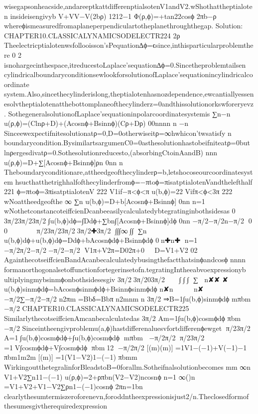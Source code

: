 {{{{{{{{{{{wisegapsonheacside,andareeptkattdifferenptialsotenV1andV2.wShothattheptialoten
insideisengivyb
V+VV−V(2bρ)
1212−1
Φ(ρ,ϕ)=+tan22cosϕ
2πb−ρ
whereϕismeasuredfromaplaneperpendiculartotheplanethroughthegap.
Solution:
CHAPTER10.CLASSICALYNAMICSODELECTR224
2ρ
Theelectricptialotenwsfollooisson’sPequation∆ϕ=ϵsince,inthisparticularproblemthere
0
2
isnohargecinthespace,itreducestoLaplace’sequation∆ϕ=0.Sincetheproblemtailsen
cylindricalboundaryconditionsewlookforsolutionofLaplace’sequationincylindricalcoordinate
system.Also,sincethecylinderislong,theptialotenhasnozdependence,ewcantiallyessen
esolvtheptialotenatthebottomplaneofthecylinderz=0andthissolutionorkswforeryevz.
SothegeneralsolutionofLaplace’sequationinpolarcoordinatesystemis
∑n−n
u(ρ,ϕ)=(Clnρ+D)+(Acosnϕ+Bsinnϕ)(Cρ+Dρ)
00nnnn
n
−n
Sinceewexpectifnitesolutionatρ=0,D=0otherwiseitρ=∞hwhicon’twsatisfy
n
boundarycondition.BysimilartsargumenC0=0asthesolutionhastobeifniteatρ=0but
lnρergesdivatρ=0.Sothesolutionreducesto,(absorbingCtoinAandB)
nnn
u(ρ,ϕ)=D+∑[Acosnϕ+Bsinnϕ]ρn
0nn
n
Theboundaryconditionare,attheedgeofthecylinderρ=b,letshocoseourcoordinatesystem
hsucthatthetrighhalfofthecylinderfromϕ=−πtoϕ=πisatptialotenVandthelefthalf
221
ϕ=πtoϕ=3πisatptialotenV
222
{V1if−π<ϕ<π
u(b,ϕ)=22
Vifπ<ϕ<3π
222
wNoattheedgeofthe
∞
∑n
u(b,ϕ)=D+b[Acosnϕ+Bsinnϕ]
0nn
n=1
wNothetconstancoteiffcienDcanbeeasilycalculatedybtegratinginbothsidesas
0
3π/23π/23π/2
∫u(b,ϕ)dϕ=∫Ddϕ+∑bn∫[Acosnϕ+Bsinnϕ]dϕ
0nn
−π/2−π/2n−π/2
0
0

✚❃
✚❃
✚
π/23π/23π/23π/2✚3π/2
∫∫∫∞∫∫
∑n✚✚
✚✚
u(b,ϕ)dϕ+u(b,ϕ)dϕ=Ddϕ+bAcosnϕdϕ+Bsinnϕdϕ
0n✚n✚
n=1✚
✚
−π/2π/2−π/2−π/2−π/2
V1π+V2π=D02π+0✚✚
D=V1+V2
02
AgainthecotseiffcienBandAcanbecalculatedybusingthefactthat{sinϕ}and{cosϕ}
nnnn
formanorthogonalsetoffunctionfortegerinsetofn.tegratingIntheeabvoexpressionyb
ultiplyingmybsinmϕonbothsidesesgiv
3π/23π/203π/2
✘✿
∫∫✘∫
∑✘✘
n✘✘
✘
u(b,ϕ)sinmϕdϕ=bAcosnϕsinmϕdϕ+Bsinnϕsinmϕdϕ
n✘n
✘✘
✘
n✘
−π/2∑−π/2−π/2
n2πm
=Bbδ=Bbπ
n2mnm
n
3π/2
⇒B=1∫u(b,ϕ)sinmϕdϕ
mπbm
−π/2
CHAPTER10.CLASSICALYNAMICSODELECTR225
SimilarlythecotseiffcienAmcanbecalculatedas
3π/2
Am=1∫u(b,ϕ)cosmϕdϕ
πbm
−π/2
Sinceintheengivproblemu(a,ϕ)hastdifferenaluesvfortdifferenϕewget
π/23π/2
A=1∫u(b,ϕ)cosmϕdϕ+∫u(b,ϕ)cosmϕdϕ
mπbm
−π/2π/2
π/23π/2
=1V∫cosmϕdϕ+V∫cosmϕdϕ
πbm12
−π/2π/2
[(m)(m)]
=1V1−(−1)+V(−1)−1
πbm1m2m
[(m)]
=1(V1−V2)1−(−1)
πbmm
WirkingoutthetegralinforBleadstoB=0forallm.Sotheifnalsolutionbecomes
mm
∞n
V1+V2∑n11−(−1)
u(ρ,ϕ)=2+ρπbn(V2−V2)ncosnϕ
n=1
∞()n
=V1+V2+V1−V2∑ρn1−(−1)cosnϕ
2πn=1bn
clearlythesumtermiszeroforenevn,foroddntheexpressionisjust2/n.Theclosedformof
thesumesgivtherequiredexpression
}}}}}}}}}}}}
